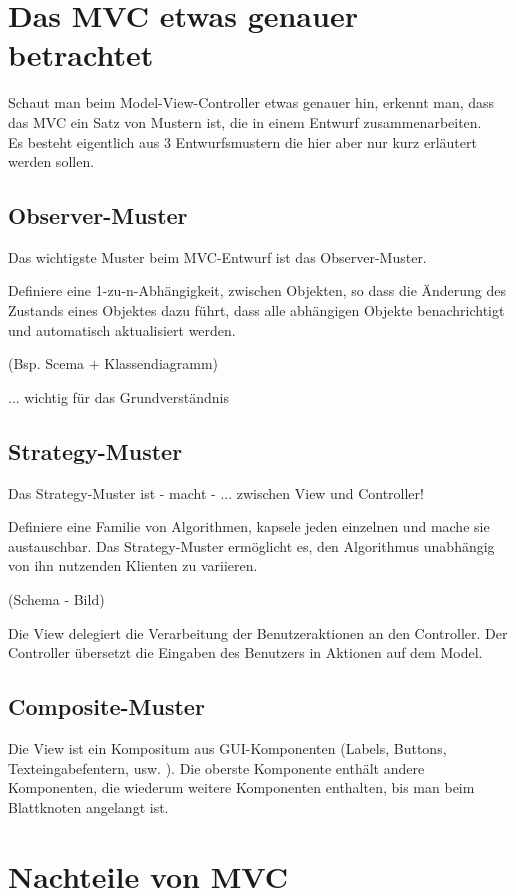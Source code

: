 \documentclass[11pt,a4paper,titlepage]{scrreprt}
\begin{document}
\section{Das MVC etwas genauer betrachtet}
Schaut man beim Model-View-Controller etwas genauer hin, erkennt man, dass das MVC
ein Satz von Mustern ist, die in einem Entwurf zusammenarbeiten.\\
Es besteht eigentlich aus 3 Entwurfsmustern die hier aber nur kurz erläutert werden
sollen.

\subsection{Observer-Muster}
Das wichtigste Muster beim MVC-Entwurf ist das Observer-Muster. 

Definiere eine 1-zu-n-Abhängigkeit, zwischen Objekten, so dass die Änderung des
Zustands eines Objektes dazu führt, dass alle abhängigen Objekte benachrichtigt
und automatisch aktualisiert werden.

(Bsp. Scema + Klassendiagramm)

... wichtig für das Grundverständnis


\subsection{Strategy-Muster}
Das Strategy-Muster ist - macht - ... zwischen View und Controller! 

Definiere eine Familie von Algorithmen, kapsele jeden einzelnen und mache sie austauschbar.
Das Strategy-Muster ermöglicht es, den Algorithmus unabhängig von ihn nutzenden Klienten
zu variieren.

(Schema - Bild)

Die View delegiert die Verarbeitung der Benutzeraktionen an den Controller. Der Controller
übersetzt die Eingaben des Benutzers in Aktionen auf dem Model.


\subsection{Composite-Muster}
Die View ist ein Kompositum aus GUI-Komponenten (Labels, Buttons, Texteingabefentern, usw. ).
Die oberste Komponente enthält andere Komponenten, die wiederum weitere Komponenten enthalten,
bis man beim Blattknoten angelangt ist.


\section{Nachteile von MVC}
\end{document}
